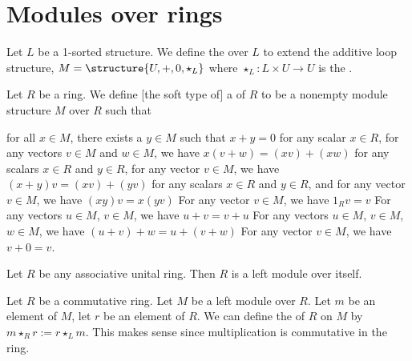 \section{Modules over rings}

\begin{definition}
Let $L$ be a 1-sorted structure.
We define the  over $L$ to extend the
additive loop structure, $M=\structure{U,+,0,\star_{L}}$ where
$\star_{L}\colon L\times U\to U$ is the .
\end{definition}

\begin{definition}
Let $R$ be a ring.
We define [the soft type of] a  of $R$ to be a
nonempty module structure $M$ over $R$ such that
\begin{itemize}
 for all $x\in M$, there exists a $y\in M$ such that $x+y=0$
 for any scalar
$x\in R$, for any vectors $v\in M$ and $w\in M$, we have $x(v+w)=(xv)+(xw)$
 for any scalars
$x\in R$ and $y\in R$, for any vector $v\in M$, we have $(x+y)v=(xv)+(yv)$
 for any scalars
$x\in R$ and $y\in R$, and for any vector $v\in M$, we have $(xy)v=x(yv)$
 For any vector $v\in M$, we have $1_{R}v=v$
 For any vectors
$u\in M$, $v\in M$, we have $u+v=v+u$
 For any vectors
$u\in M$, $v\in M$, $w\in M$, we have $(u+v)+w=u+(v+w)$
 For any vector $v\in M$,
we have $v+0=v$.
\end{itemize}
\end{definition}

\begin{example}
Let $R$ be any associative unital ring. Then $R$ is a left module over itself.
\end{example}

\begin{definition}
Let $R$ be a commutative ring. Let $M$ be a left module over $R$.
Let $m$ be an element of $M$, let $r$ be an element of $R$.
We can define the  of $R$ on $M$
by $m\star_{R}r := r\star_{L}m$. This makes sense since multiplication
is commutative in the ring.
\end{definition}

